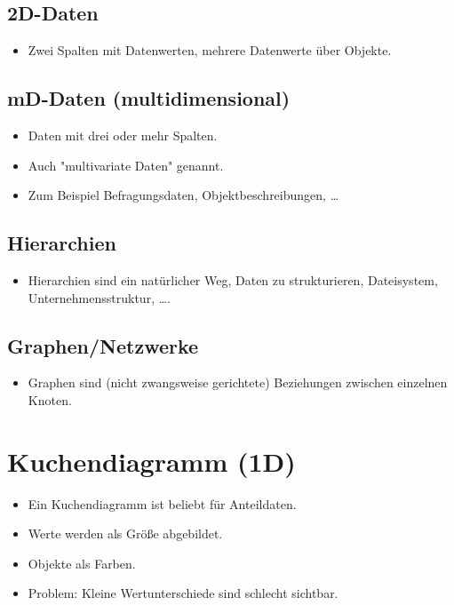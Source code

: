 		\subsection{2D-Daten}
			\begin{itemize}
				\item Zwei Spalten mit Datenwerten, \zB mehrere Datenwerte über Objekte.
			\end{itemize}

		\subsection{mD-Daten (multidimensional)}
			\begin{itemize}
				\item Daten mit drei oder mehr Spalten.
				\item Auch "multivariate Daten" genannt.
				\item Zum Beispiel Befragungsdaten, Objektbeschreibungen, \dots
			\end{itemize}

		\subsection{Hierarchien}
			\begin{itemize}
				\item Hierarchien sind ein natürlicher Weg, Daten zu strukturieren, \bspw Dateisystem, Unternehmensstruktur, \dots.
			\end{itemize}

		\subsection{Graphen/Netzwerke}
			\begin{itemize}
				\item Graphen sind (nicht zwangsweise gerichtete) Beziehungen zwischen einzelnen Knoten.
			\end{itemize}

	\section{Kuchendiagramm (1D)}
		\begin{itemize}
			\item Ein Kuchendiagramm ist beliebt für Anteildaten.
			\item Werte werden als Größe abgebildet.
			\item Objekte als Farben.
			\item Problem: Kleine Wertunterschiede sind schlecht sichtbar.
		\end{itemize}


